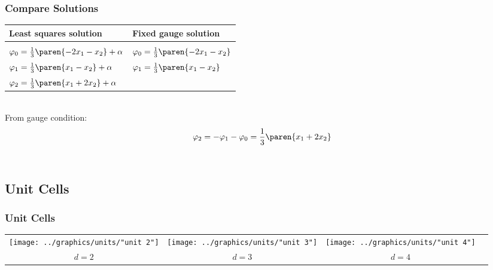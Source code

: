 \documentclass[]{beamer}
\begin{document}
\begin{frame}      %
\frametitle{Compare Solutions}
    \begin{table}[htdp]
        \begin{center}
            \begin{tabular}{ll}
              Least squares solution & Fixed gauge solution \\\hline
              \\
              $\varphi_{0} = \frac{1}{3} \paren{ -2x_{1} - x_{2} } + \alpha$ & $\varphi_{0} = \frac{1}{3} \paren{ -2x_{1} - x_{2} }$ \\[10pt]
              $\varphi_{1} = \frac{1}{3} \paren{ x_{1} - x_{2} } + \alpha$ & $\varphi_{1} = \frac{1}{3} \paren{ x_{1} - x_{2} }$ \\[10pt]
              $\varphi_{2} = \frac{1}{3} \paren{ x_{1} + 2 x_{2} } + \alpha$
            \end{tabular}
        \end{center}
    \end{table}%
  \pause
  \ \\[10pt]
  From gauge condition:
  $$\varphi_{2} = -\varphi_{1} -\varphi_{0} = \frac{1}{3} \paren{ x_{1} + 2 x_{2} }$$ \\
  \twodots
\end{frame}

\subsection{Unit Cells}

\begin{frame}      %
\frametitle{Unit Cells}
  \begin{table}[htdp]
    \begin{center}
      \begin{tabular}{cccc}
        \texttt{[image: ../graphics/units/"unit 2"]} &
        \texttt{[image: ../graphics/units/"unit 3"]} &
        \texttt{[image: ../graphics/units/"unit 4"]} \\
        $d = 2$ &
        $d = 3$ &
        $d = 4$
      \end{tabular}
    \end{center}
  \end{table}%
\end{frame}
\end{document}
